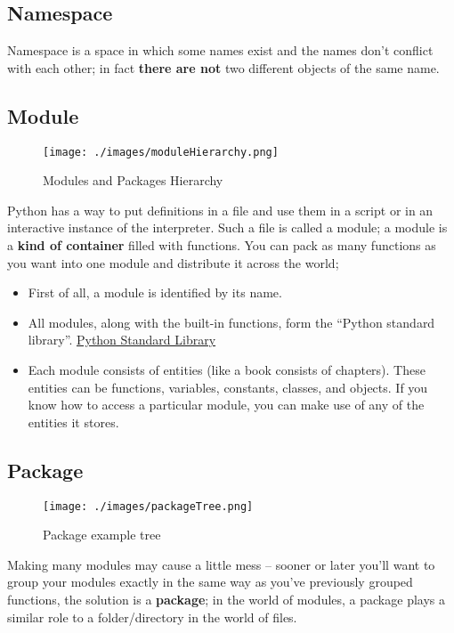 \documentclass[11pt]{article}
\begin{document}
\subsection{Namespace}
\label{sec:org178285b}
Namespace is a space in which some names exist and the names don’t
conflict with each other; in fact \textbf{there are not} two different objects of the
same name.
\subsection{Module}
\label{sec:org114c8c7}

\begin{figure}[htbp]
\centering
\texttt{[image: ./images/moduleHierarchy.png]}
\caption{Modules and Packages Hierarchy}
\end{figure}

Python has a way to put definitions in a file and use them in a script
or in an interactive instance of the interpreter. Such a file is
called a module; a module is a \textbf{kind of container} filled with
functions. You can pack as many functions as you want into one module
and distribute it across the world;

\begin{itemize}
\item First of all, a module is identified by its name.
\item All modules, along with the built-in functions, form the
“Python standard library”. \href{https://docs.python.org/3/library/index.html}{Python Standard Library}
\item Each module consists of entities (like a book consists of
chapters). These entities can be functions, variables, constants,
classes, and objects. If you know how to access a particular module,
you can make use of any of the entities it stores.
\end{itemize}

\newpage
\subsection{Package}
\label{sec:org5cf2683}

\begin{figure}[htbp]
\centering
\texttt{[image: ./images/packageTree.png]}
\caption{Package example tree}
\end{figure}

Making many modules may cause a little mess – sooner or
later you’ll want to group your modules exactly in the
same way as you’ve previously grouped functions, the
solution is a \textbf{package}; in the world of modules, a
package plays a similar role to a folder/directory in the
world of files.
\end{document}
